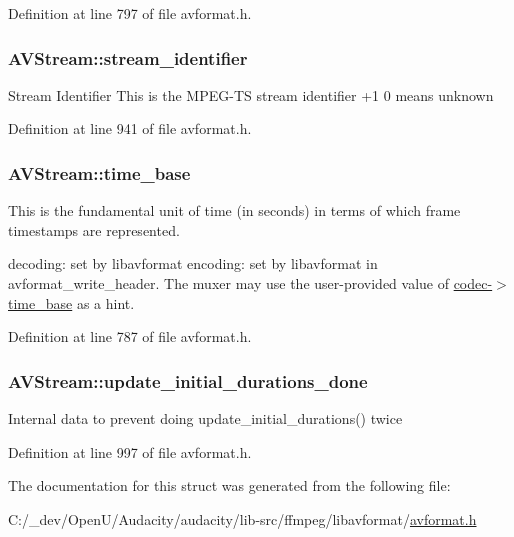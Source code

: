 Definition at line 797 of file avformat.\+h.

\subsubsection[{\texorpdfstring{stream\+\_\+identifier}{stream_identifier}}]{ A\+V\+Stream\+::stream\+\_\+identifier}\hypertarget{struct_a_v_stream_a1f5662cbf07c0b0d6a190f040ba93e16}{}\label{struct_a_v_stream_a1f5662cbf07c0b0d6a190f040ba93e16}
Stream Identifier This is the M\+P\+E\+G-\/\+TS stream identifier +1 0 means unknown 

Definition at line 941 of file avformat.\+h.

\subsubsection[{\texorpdfstring{time\+\_\+base}{time_base}}]{ A\+V\+Stream\+::time\+\_\+base}\hypertarget{struct_a_v_stream_a9db755451f14e2bf590d4b85d82b32e6}{}\label{struct_a_v_stream_a9db755451f14e2bf590d4b85d82b32e6}
This is the fundamental unit of time (in seconds) in terms of which frame timestamps are represented.

decoding\+: set by libavformat encoding\+: set by libavformat in avformat\+\_\+write\+\_\+header. The muxer may use the user-\/provided value of \hyperlink{struct_a_v_codec_context_ab7bfeb9fa5840aac090e2b0bd0ef7589}{codec-\/$>$time\+\_\+base} as a hint. 

Definition at line 787 of file avformat.\+h.

\subsubsection[{\texorpdfstring{update\+\_\+initial\+\_\+durations\+\_\+done}{update_initial_durations_done}}]{ A\+V\+Stream\+::update\+\_\+initial\+\_\+durations\+\_\+done}\hypertarget{struct_a_v_stream_a93fae347b93594cbe8ce7d414519b78a}{}\label{struct_a_v_stream_a93fae347b93594cbe8ce7d414519b78a}
Internal data to prevent doing update\+\_\+initial\+\_\+durations() twice 

Definition at line 997 of file avformat.\+h.



The documentation for this struct was generated from the following file\+:\begin{DoxyCompactItemize}
\item 
C\+:/\+\_\+dev/\+Open\+U/\+Audacity/audacity/lib-\/src/ffmpeg/libavformat/\hyperlink{avformat_8h}{avformat.\+h}\end{DoxyCompactItemize}

